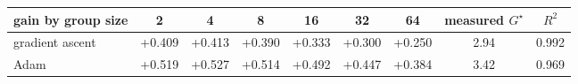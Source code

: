 \begin{tabular}{lcccccccc}
\toprule
gain by group size & 2 & 4 & 8 & 16 & 32 & 64 & measured $G^{\star}$ & $R^2$ \\
\midrule
gradient ascent & +0.409 & +0.413 & +0.390 & +0.333 & +0.300 & +0.250 & 2.94 & 0.992 \\
Adam & +0.519 & +0.527 & +0.514 & +0.492 & +0.447 & +0.384 & 3.42 & 0.969 \\
\bottomrule
\end{tabular}